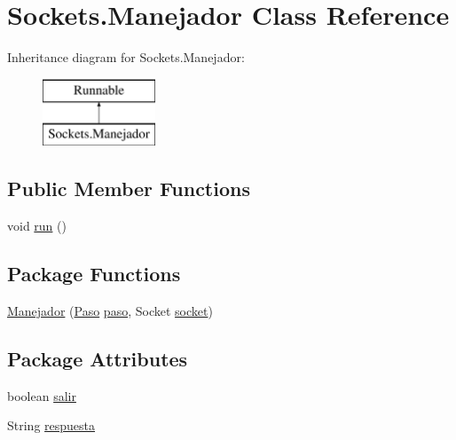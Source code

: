 \hypertarget{class_sockets_1_1_manejador}{}\section{Sockets.\+Manejador Class Reference}
\label{class_sockets_1_1_manejador}
Inheritance diagram for Sockets.\+Manejador\+:\begin{figure}[H]
\begin{center}
\leavevmode
\includegraphics[height=2.000000cm]{class_sockets_1_1_manejador}
\end{center}
\end{figure}
\subsection*{Public Member Functions}
\begin{DoxyCompactItemize}
\item 
void \mbox{\hyperlink{class_sockets_1_1_manejador_a6f0db35c12ec8b3dc008fa0e8d07324f}{run}} ()
\end{DoxyCompactItemize}
\subsection*{Package Functions}
\begin{DoxyCompactItemize}
\item 
\mbox{\hyperlink{class_sockets_1_1_manejador_a074d5730fb98ef489d0af3786f5e58cb}{Manejador}} (\mbox{\hyperlink{class_sockets_1_1_paso}{Paso}} \mbox{\hyperlink{class_sockets_1_1_manejador_a9eebde9281de4525c33c8cf7ee278975}{paso}}, Socket \mbox{\hyperlink{class_sockets_1_1_manejador_a71819caa3c23e76fcd4faa94377cae72}{socket}})
\end{DoxyCompactItemize}
\subsection*{Package Attributes}
\begin{DoxyCompactItemize}
\item 
boolean \mbox{\hyperlink{class_sockets_1_1_manejador_aa1ef67c0efe69c6b47c193c8d49a84f4}{salir}}
\item 
String \mbox{\hyperlink{class_sockets_1_1_manejador_a88d7f7ec2ce70bf96c09b715358b1b9b}{respuesta}}
\end{DoxyCompactItemize}
